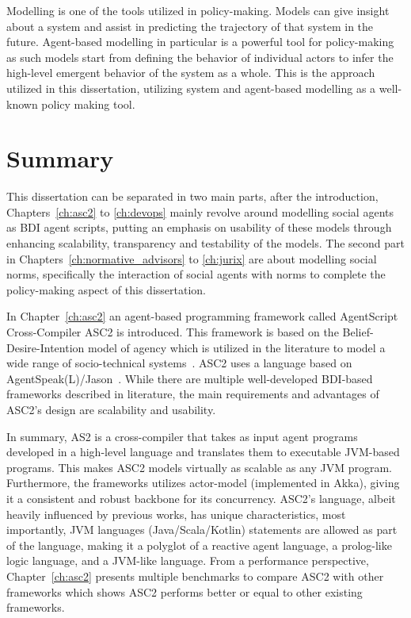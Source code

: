 Modelling is one of the tools utilized in policy-making. Models can give insight about a system and assist in predicting the trajectory of that system in the future. Agent-based modelling in particular is a powerful tool for policy-making as such models start from defining the behavior of individual actors to infer the high-level emergent behavior of the system as a whole. This is the approach utilized in this dissertation, utilizing system and agent-based modelling as a well-known policy making tool.


\section{Summary}

This dissertation can be separated in two main parts, after the introduction, Chapters~\ref{ch:asc2} to \ref{ch:devops} mainly revolve around modelling social agents as BDI agent scripts, putting an emphasis on usability of these models through enhancing scalability, transparency and testability of the models. The second part in Chapters~\ref{ch:normative_advisors} to \ref{ch:jurix} are about modelling social norms, specifically the interaction of social agents with norms to complete the policy-making aspect of this dissertation. 

In Chapter~\ref{ch:asc2} an agent-based programming framework called AgentScript Cross-Compiler ASC2 is introduced. This framework is based on the Belief-Desire-Intention model of agency which is utilized in the literature to model a wide range of socio-technical systems~\cite{...}. ASC2 uses a language based on AgentSpeak(L)/Jason~\cite{Jason}. While there are multiple well-developed BDI-based frameworks described in literature, the main requirements and advantages of ASC2's design are scalability and usability. 

In summary, AS2 is a cross-compiler that takes as input agent programs developed in a high-level language and translates them to executable JVM-based programs. This makes ASC2 models virtually as scalable as any JVM program. Furthermore, the frameworks utilizes actor-model (implemented in Akka), giving it a consistent and robust backbone for its concurrency. ASC2's language, albeit heavily influenced by previous works, has unique characteristics, most importantly, JVM languages (Java/Scala/Kotlin) statements are allowed as part of the language, making it a polyglot of a reactive agent language, a prolog-like logic language, and a JVM-like language. From a performance perspective, Chapter~\ref{ch:asc2} presents multiple benchmarks to compare ASC2 with other frameworks which shows ASC2 performs better or equal to other existing frameworks.


